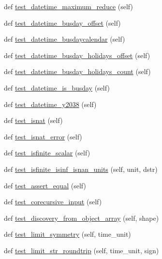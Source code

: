 \begin{DoxyCompactItemize}
def \hyperlink{classnumpy_1_1core_1_1tests_1_1test__datetime_1_1TestDateTime_a2ab14e3d0a1d1b25bb81f5625236795c}{test\+\_\+datetime\+\_\+maximum\+\_\+reduce} (self)
\item 
def \hyperlink{classnumpy_1_1core_1_1tests_1_1test__datetime_1_1TestDateTime_ac53dd21f8658b8edbec5bb72f6f4855d}{test\+\_\+datetime\+\_\+busday\+\_\+offset} (self)
\item 
def \hyperlink{classnumpy_1_1core_1_1tests_1_1test__datetime_1_1TestDateTime_a869407983a55ba77b7207aa28908598e}{test\+\_\+datetime\+\_\+busdaycalendar} (self)
\item 
def \hyperlink{classnumpy_1_1core_1_1tests_1_1test__datetime_1_1TestDateTime_ad86da87484390ade2166a42602811f6e}{test\+\_\+datetime\+\_\+busday\+\_\+holidays\+\_\+offset} (self)
\item 
def \hyperlink{classnumpy_1_1core_1_1tests_1_1test__datetime_1_1TestDateTime_a1365015c44bdf849a3371cc4c33fbdf4}{test\+\_\+datetime\+\_\+busday\+\_\+holidays\+\_\+count} (self)
\item 
def \hyperlink{classnumpy_1_1core_1_1tests_1_1test__datetime_1_1TestDateTime_ac841fc7d042da0682d16133ab778d6bb}{test\+\_\+datetime\+\_\+is\+\_\+busday} (self)
\item 
def \hyperlink{classnumpy_1_1core_1_1tests_1_1test__datetime_1_1TestDateTime_a59cfc69675f0ec1c47e94b949679d4e0}{test\+\_\+datetime\+\_\+y2038} (self)
\item 
def \hyperlink{classnumpy_1_1core_1_1tests_1_1test__datetime_1_1TestDateTime_a2c94b50c8c9d480168f71e76983916bb}{test\+\_\+isnat} (self)
\item 
def \hyperlink{classnumpy_1_1core_1_1tests_1_1test__datetime_1_1TestDateTime_a43fae8f61550edbac753a60eb8cb2a20}{test\+\_\+isnat\+\_\+error} (self)
\item 
def \hyperlink{classnumpy_1_1core_1_1tests_1_1test__datetime_1_1TestDateTime_a184af7871d71d97aab3587fe91d37b01}{test\+\_\+isfinite\+\_\+scalar} (self)
\item 
def \hyperlink{classnumpy_1_1core_1_1tests_1_1test__datetime_1_1TestDateTime_a28d9428842d7c491b5d9dd8e5dd04e34}{test\+\_\+isfinite\+\_\+isinf\+\_\+isnan\+\_\+units} (self, unit, dstr)
\item 
def \hyperlink{classnumpy_1_1core_1_1tests_1_1test__datetime_1_1TestDateTime_abf090765cd096f2412238df2e7e5e974}{test\+\_\+assert\+\_\+equal} (self)
\item 
def \hyperlink{classnumpy_1_1core_1_1tests_1_1test__datetime_1_1TestDateTime_af69fe2bffc445acfb38ee3c5134dd2d7}{test\+\_\+corecursive\+\_\+input} (self)
\item 
def \hyperlink{classnumpy_1_1core_1_1tests_1_1test__datetime_1_1TestDateTime_a0481a4d4f7fa3dc42663b791e5fea407}{test\+\_\+discovery\+\_\+from\+\_\+object\+\_\+array} (self, shape)
\item 
def \hyperlink{classnumpy_1_1core_1_1tests_1_1test__datetime_1_1TestDateTime_ac2f7b0d2d5f78c7af4114535bd2019b8}{test\+\_\+limit\+\_\+symmetry} (self, time\+\_\+unit)
\item 
def \hyperlink{classnumpy_1_1core_1_1tests_1_1test__datetime_1_1TestDateTime_af5ac42b594eb40f4f00c0441de0b179c}{test\+\_\+limit\+\_\+str\+\_\+roundtrip} (self, time\+\_\+unit, sign)
\end{DoxyCompactItemize}
